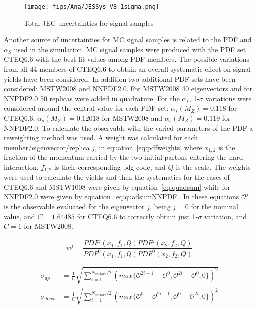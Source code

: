 \begin{figure}[!Hhtbp]
  \begin{center}
    \texttt{[image: figs/Ana/JESSys\_V8\_1sigma.png]}
    \caption{Total JEC uncertainties for signal samples}
    \label{fig:TotalJECSys}
  \end{center}
\end{figure}

Another source of uncertainties for MC signal samples is related to the PDF and $\alpha_{S}$ used in the simulation. MC signal samples were produced with the PDF set CTEQ6.6 with the best fit values among PDF members. The possible variations from all 44 members of CTEQ6.6 to obtain an overall systematic effect on signal yields have been considered. In addition two additional PDF sets have been considered: MSTW2008 and NNPDF2.0. For MSTW2008 40 eigenvectors and for NNPDF2.0 50 replicas were added in quadrature. For the $\alpha_{s}$, 1-$\sigma$ variations were considered around the central value for each PDF set: $\alpha_{s}(M_{Z})=0.118$ for CTEQ6.6, $\alpha_{s}(M_{Z})=0.12018$ for MSTW2008 and $\alpha_{s}(M_{Z})=0.119$ for NNPDF2.0. To calculate the observable with the varied parameters of the PDF a reweighting method was used. A weight was calculated for each member/eigenvector/replica $j$, in equation~\ref{eq:pdfweights} where $x_{1,2}$ is the fraction of the momentum carried by the two initial partons entering the hard interaction, $f_{1,2}$ is their corresponding pdg code, and $Q$ is the scale. The weights were used to calculate the yields and then the systematics for the cases of CTEQ6.6 and MSTW1008 were given by equation~\ref{eq:quadsum} while for NNPDF2.0 were given by equation~\ref{eq:quadsumNNPDF}. In these equations $\mathcal{O}^{j}$ is the observable evaluated for the eigenvector $j$, being $j=0$ for the nominal value, and $C=1.64485$ for CTEQ6.6 to correctly obtain just 1-$\sigma$ variation, and $C=1$ for MSTW2008.

\begin{equation} \label{eq:pdfweights}
w^{j}=\frac{PDF^{j}(x_{1},f_{1},Q)PDF^{j}(x_{2},f_{2},Q)}{PDF^{0}(x_{1},f_{1},Q)PDF^{0}(x_{2},f_{2},Q)}
\end{equation}

\begin{align} \label{eq:quadsum}
\sigma_{up} & = \frac{1}{C}\sqrt{\sum_{i=1}^{N_{vectors}/2}(max\{\mathcal{O}^{2i-1}-\mathcal{O}^{0},\mathcal{O}^{2i}-\mathcal{O}^{0},0\})^{2}} \nonumber\\
\sigma_{down} & = \frac{1}{C}\sqrt{\sum_{i=1}^{N_{vectors}/2}(max\{\mathcal{O}^{0}-\mathcal{O}^{2i-1},\mathcal{O}^{0}-\mathcal{O}^{2i},0\})^{2}}
\end{align}

